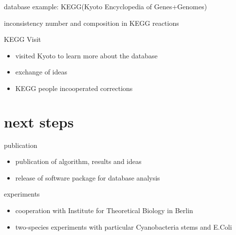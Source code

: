 \documentclass[style=aggie]{powerdot}
\begin{document}
\begin{slide}{database example: KEGG\newline (Kyoto Encyclopedia of Genes+Genomes)}
\begin{figure}
\begin{small}
\end{small}

\end{figure}
inconsistency number and composition in KEGG reactions
\end{slide}

\begin{slide}{KEGG Visit}
 \begin{itemize}
  \item visited Kyoto to learn more about the database\newline\pause
  \item exchange of ideas\newline\pause
  \item KEGG people incooperated corrections\pause
 \end{itemize}

\end{slide}

\section{next steps}
\begin{slide}{publication}
\begin{itemize}
  \item publication of algorithm, results and ideas\newline\pause
  \item release of software package for database analysis
\end{itemize}
\end{slide}

\begin{slide}{experiments}
 \begin{itemize}
  \item cooperation with Institute for Theoretical Biology in Berlin \newline \pause
  \item two-species experiments with particular Cyanobacteria stems and E.Coli  
 \end{itemize}

\end{slide}
\end{document}
